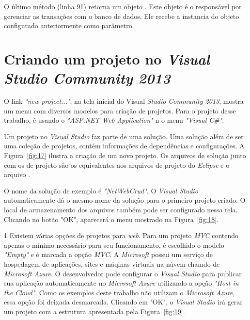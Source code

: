 O último método (linha 91) retorna um objeto . Este objeto é o responsável por gerenciar as transações com o banco de dados. Ele recebe a instancia do objeto  configurado anteriormente como parâmetro.

\section{Criando um projeto \anmvc no \textit{Visual Studio Community 2013}}

O link \textit{"new project..."}, na tela inicial do Visual \textit{Studio Community 2013}, mostra um menu com diversos modelos para criação de projetos. Para o projeto desse trabalho, é usando o \textit{"ASP.NET Web Application"} n o menu \textit{"Visual C\#"}.

Um projeto no \textit{Visual Studio} faz parte de uma solução. Uma solução além de ser uma coleção de projetos, contém informações de dependências e configurações. A Figura~\ref{fig:17} ilustra a criação de um novo projeto. Os arquivos de solução junto com os de projeto são os equivalentes aos arquivos de projeto do \textit{Eclipse} e o arquivo .


O nome da solução de exemplo é \textit{"NetWebCrud"}. O \textit{Visual Studio} automaticamente dá o mesmo nome da solução para o primeiro projeto criado. O local de armazenamento dos arquivos também pode ser configurado nessa tela. Clicando no botão "OK", aparecerá o menu mostrado na Figura~\ref{fig:18}.

{1}
Existem várias opções de projetos para \textit{web}. Para um projeto \textit{MVC} contendo apenas o mínimo necessário para seu funcionamento, é escolhido o modelo \textit{"Empty"} e é marcada a opção \textit{MVC}. A \textit{Microsoft} possui um serviço de hospedagem de aplicações, sites e máqinas virtuais na núvem chamdo de \textit{Microsoft Azure}. O desenvolvedor pode configurar o \textit{Visual Studio} para publicar sua aplicação automaticamente no \textit{Microsoft Azure} utilizando a opção \textit{"Host in the Cloud"}. Como os exemplos deste trabalho não utilizam o \textit{Microsoft Azure}, essa opção foi deixada desmarcada. Clicando em "OK", o \textit{Visual Studio} irá gerar um projeto com a estrutura apresentada pela Figura~\ref{fig:19}.

